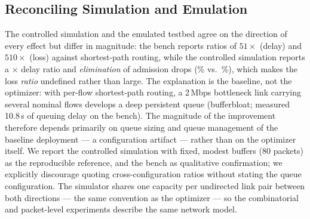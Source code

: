 \documentclass[journal]{IEEEtran}
\begin{document}
\subsection{Reconciling Simulation and Emulation}
\label{sec:bench}
The controlled simulation and the emulated testbed agree on the direction of
every effect but differ in magnitude: the bench reports ratios of $51\times$
(delay) and $510\times$ (loss) against shortest-path routing, while the
controlled simulation reports a \SimDelayRatio$\times$ delay ratio and
\emph{elimination} of admission drops (\SimLossOpt\% vs.\ \SimLossDj\%),
which makes the loss \emph{ratio} undefined rather than large. The
explanation is the baseline, not the optimizer: with per-flow
shortest-path routing, a 2\,Mbps bottleneck link carrying several nominal
flows develops a deep persistent queue (bufferbloat; measured 10.8\,s of
queuing delay on the bench). The magnitude of the improvement therefore
depends primarily on queue sizing and queue management of the baseline
deployment --- a configuration artifact --- rather than on the optimizer
itself. We report the controlled simulation with fixed, modest buffers
(80 packets) as the reproducible reference, and the bench as qualitative
confirmation; we explicitly discourage quoting cross-configuration ratios
without stating the queue configuration. The simulator shares one capacity
per undirected link pair between both directions --- the same convention as
the optimizer --- so the combinatorial and packet-level experiments describe
the same network model.

\end{document}
